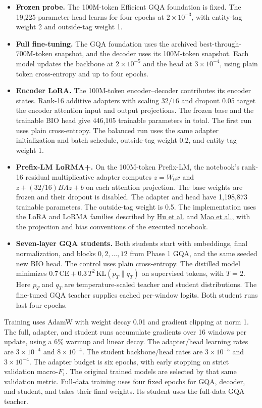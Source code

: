\documentclass[11pt,a4paper]{article}
\begin{document}
\begin{itemize}[leftmargin=*]
\item \textbf{Frozen probe.} The 100M-token Efficient GQA foundation is fixed. The 19,225-parameter head learns for four epochs at \(2\times 10^{-3}\), with entity-tag weight 2 and outside-tag weight 1.
\item \textbf{Full fine-tuning.} The GQA foundation uses the archived best-through-700M-token snapshot, and the decoder uses its 100M-token snapshot. Each model updates the backbone at \(2\times 10^{-5}\) and the head at \(3\times 10^{-4}\), using plain token cross-entropy and up to four epochs.
\item \textbf{Encoder LoRA.} The 100M-token encoder--decoder contributes its encoder states. Rank-16 additive adapters with scaling \(32/16\) and dropout 0.05 target the encoder attention input and output projections. The frozen base and the trainable BIO head give 446,105 trainable parameters in total. The first run uses plain cross-entropy. The balanced run uses the same adapter initialization and batch schedule, outside-tag weight 0.2, and entity-tag weight 1.
\item \textbf{Prefix-LM LoRMA+.} On the 100M-token Prefix-LM, the notebook's rank-16 residual multiplicative adapter computes \(z=W_0x\) and \(z+(32/16)BAz+b\) on each attention projection. The base weights are frozen and their dropout is disabled. The adapter and head have 1,198,873 trainable parameters. The outside-tag weight is 0.5. The implementation uses the LoRA and LoRMA families described by \href{https://arxiv.org/abs/2106.09685}{Hu et al.} and \href{https://aclanthology.org/2025.findings-acl.527/}{Mao et al.}, with the projection and bias conventions of the executed notebook.
\item \textbf{Seven-layer GQA students.} Both students start with embeddings, final normalization, and blocks \(0,2,\ldots,12\) from Phase 1 GQA, and the same seeded new BIO head. The control uses plain cross-entropy. The distilled model minimizes \(0.7\,\mathrm{CE}+0.3\,T^2\,\mathrm{KL}(p_T\|q_T)\) on supervised tokens, with \(T=2\). Here \(p_T\) and \(q_T\) are temperature-scaled teacher and student distributions. The fine-tuned GQA teacher supplies cached per-window logits. Both student runs last four epochs.
\end{itemize}

Training uses AdamW with weight decay 0.01 and gradient clipping at norm 1. The full, adapter, and student runs accumulate gradients over 16 windows per update, using a 6\% warmup and linear decay. The adapter/head learning rates are \(3\times 10^{-4}\) and \(8\times 10^{-4}\). The student backbone/head rates are \(3\times 10^{-5}\) and \(3\times 10^{-4}\). The adapter budget is six epochs, with early stopping on strict validation macro-\(F_1\). The original trained models are selected by that same validation metric. Full-data training uses four fixed epochs for GQA, decoder, and student, and takes their final weights. Its student uses the full-data GQA teacher.
\end{document}
